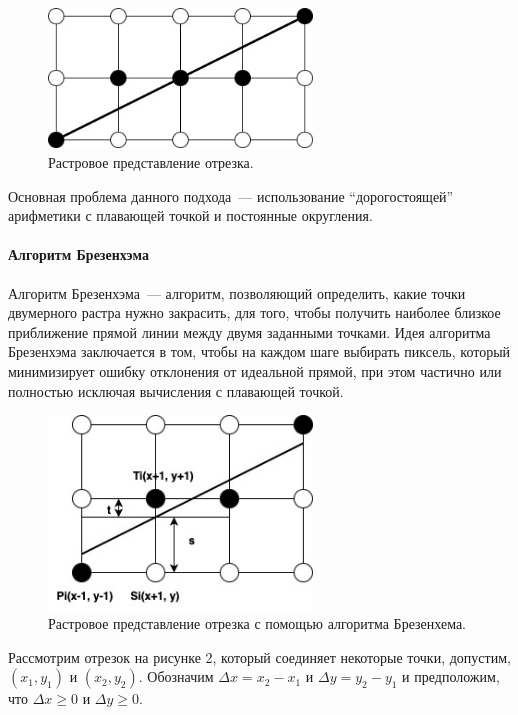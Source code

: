 \begin{figure}[H]
    \centering
    \includegraphics[width = 7cm]{basic_line.jpg}
    \caption{Растровое представление отрезка.}
    \label{fig:float}
\end{figure}

Основная проблема данного подхода~--- использование ``дорогостоящей'' арифметики с плавающей точкой и постоянные округления.

\paragraph*{Алгоритм Брезенхэма}
Алгоритм Брезенхэма~--- алгоритм, позволяющий определить, какие точки двумерного растра нужно закрасить, для того, чтобы получить наиболее близкое приближение прямой линии между двумя заданными точками. Идея алгоритма Брезенхэма заключается в том, чтобы на каждом шаге выбирать пиксель, который минимизирует ошибку отклонения от идеальной прямой, при этом частично или полностью исключая вычисления с плавающей точкой.

\begin{figure}[H]
    \centering
    \includegraphics[width = 7cm]{brezenhein_line.jpg}
    \caption{Растровое представление отрезка с помощью алгоритма Брезенхема.}
    \label{fig:float}
\end{figure}

Рассмотрим отрезок на рисунке 2, который соединяет некоторые точки, допустим, $(x_1, y_1)$ и $(x_2, y_2)$. Обозначим $\Delta x = x_2 - x_1$ и $\Delta y = y_2 - y_1$ и предположим, что $\Delta x \geq 0$ и $\Delta y \geq 0$.

